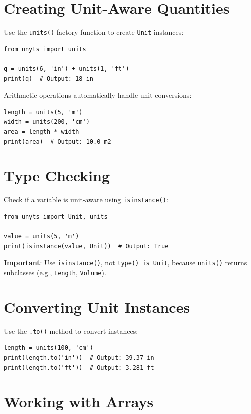 \documentclass[11pt,a4paper]{report}
\begin{document}
\section{Creating Unit-Aware Quantities}

Use the \texttt{units()} factory function to create \texttt{Unit} instances:

\begin{lstlisting}[style=pythonstyle]
from unyts import units

q = units(6, 'in') + units(1, 'ft')
print(q)  # Output: 18_in
\end{lstlisting}

Arithmetic operations automatically handle unit conversions:

\begin{lstlisting}[style=pythonstyle]
length = units(5, 'm')
width = units(200, 'cm')
area = length * width
print(area)  # Output: 10.0_m2
\end{lstlisting}

\section{Type Checking}

Check if a variable is unit-aware using \texttt{isinstance()}:

\begin{lstlisting}[style=pythonstyle]
from unyts import Unit, units

value = units(5, 'm')
print(isinstance(value, Unit))  # Output: True
\end{lstlisting}

\textbf{Important}: Use \texttt{isinstance()}, not \texttt{type() is Unit}, because \texttt{units()} returns subclasses (e.g., \texttt{Length}, \texttt{Volume}).

\section{Converting Unit Instances}

Use the \texttt{.to()} method to convert instances:

\begin{lstlisting}[style=pythonstyle]
length = units(100, 'cm')
print(length.to('in'))  # Output: 39.37_in
print(length.to('ft'))  # Output: 3.281_ft
\end{lstlisting}

\section{Working with Arrays}
\end{document}
